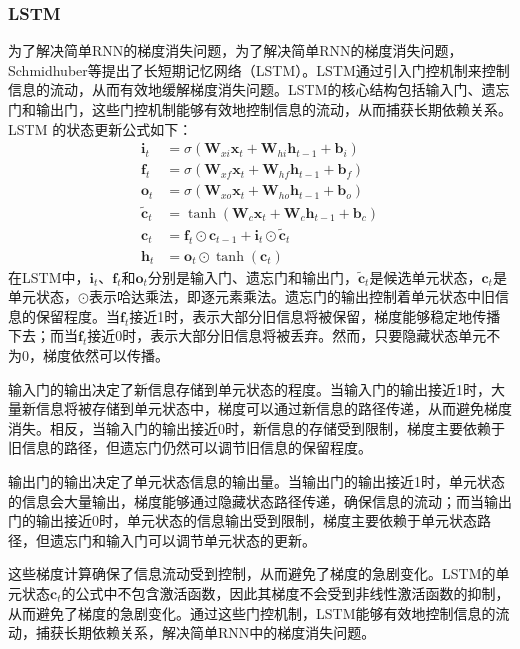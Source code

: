 \subsubsection{LSTM}
为了解决简单RNN的梯度消失问题，为了解决简单RNN的梯度消失问题，Schmidhuber等提出了长短期记忆网络（LSTM）\cite{schmidhuber1997long}。LSTM通过引入门控机制来控制信息的流动，从而有效地缓解梯度消失问题。LSTM的核心结构包括输入门、遗忘门和输出门，这些门控机制能够有效地控制信息的流动，从而捕获长期依赖关系。
LSTM 的状态更新公式如下：
\begin{align}
  \mathbf{i}_t         & = \sigma(\mathbf{W}_{xi} \mathbf{x}_t + \mathbf{W}_{hi} \mathbf{h}_{t-1} + \mathbf{b}_i) \\
  \mathbf{f}_t         & = \sigma(\mathbf{W}_{xf} \mathbf{x}_t + \mathbf{W}_{hf} \mathbf{h}_{t-1} + \mathbf{b}_f) \\
  \mathbf{o}_t         & = \sigma(\mathbf{W}_{xo} \mathbf{x}_t + \mathbf{W}_{ho} \mathbf{h}_{t-1} + \mathbf{b}_o) \\
  \tilde{\mathbf{c}}_t & = \tanh(\mathbf{W}_c \mathbf{x}_t + \mathbf{W}_c \mathbf{h}_{t-1} + \mathbf{b}_c)        \\
  \mathbf{c}_t         & = \mathbf{f}_t \odot \mathbf{c}_{t-1} + \mathbf{i}_t \odot  \tilde{\mathbf{c}}_t         \\
  \mathbf{h}_t         & = \mathbf{o}_t \odot \tanh(\mathbf{c}_t)
\end{align}
在LSTM中，$\mathbf{i}_t$、$\mathbf{f}_t$和$\mathbf{o}_t$分别是输入门、遗忘门和输出门，$\tilde{\mathbf{c}}_t$是候选单元状态，$\mathbf{c}_t$是单元状态，$\odot$表示哈达乘法，即逐元素乘法。遗忘门的输出控制着单元状态中旧信息的保留程度。当$\mathbf{f}_t$接近1时，表示大部分旧信息将被保留，梯度能够稳定地传播下去；而当$\mathbf{f}_t$接近0时，表示大部分旧信息将被丢弃。然而，只要隐藏状态单元不为0，梯度依然可以传播。

输入门的输出决定了新信息存储到单元状态的程度。当输入门的输出接近1时，大量新信息将被存储到单元状态中，梯度可以通过新信息的路径传递，从而避免梯度消失。相反，当输入门的输出接近0时，新信息的存储受到限制，梯度主要依赖于旧信息的路径，但遗忘门仍然可以调节旧信息的保留程度。

输出门的输出决定了单元状态信息的输出量。当输出门的输出接近1时，单元状态的信息会大量输出，梯度能够通过隐藏状态路径传递，确保信息的流动；而当输出门的输出接近0时，单元状态的信息输出受到限制，梯度主要依赖于单元状态路径，但遗忘门和输入门可以调节单元状态的更新。

这些梯度计算确保了信息流动受到控制，从而避免了梯度的急剧变化。LSTM的单元状态$\mathbf{c}_t$的公式中不包含激活函数，因此其梯度不会受到非线性激活函数的抑制，从而避免了梯度的急剧变化。通过这些门控机制，LSTM能够有效地控制信息的流动，捕获长期依赖关系，解决简单RNN中的梯度消失问题。

